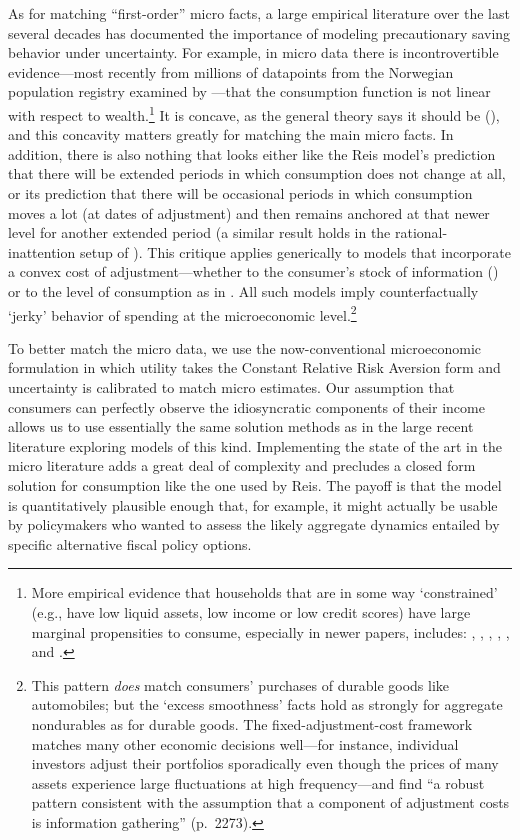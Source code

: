 As for matching ``first-order'' micro facts, a large empirical literature over the last several decades has documented the importance of modeling precautionary saving behavior under uncertainty. For example, in micro data there is incontrovertible evidence---most recently from millions of datapoints from the Norwegian population registry examined by \cite{fhnMPC}---that the consumption function is not linear with respect to wealth.\footnote{More empirical evidence that households that are in some way `constrained' (e.g., have low liquid assets, low income or low credit scores) have large marginal propensities to consume, especially in newer papers, includes: \cite{jpsTax}, \cite{aslCredit}, \cite{bppInequality}, \cite{kvwWealthyH2m}, \cite{jappelliPistaferri_FPMPC}, \cite{parker25million} and \cite{aydinCresponse}.}  It is concave, as the general theory says it should be (\cite{carroll&kimball:concavity}), and this concavity matters greatly for matching the main micro facts.  In addition, there is also nothing that looks  either like the Reis model's prediction that there will be extended periods in which consumption does not change at all, or its prediction that there will be occasional periods in which consumption moves a lot (at dates of adjustment) and then remains anchored at that newer level for another extended period (a similar result holds in the rational-inattention setup of \cite{tutino_RIconsumption}).  This critique applies generically to models that incorporate a convex cost of adjustment---whether to the consumer's stock of information (\cite{reis:inattentive}) or to the level of consumption as in \cite{chettySzeidl:cCommitmentsEcta}.  All such models imply counterfactually `jerky' behavior of spending at the microeconomic level.\footnote{This pattern {\it does} match consumers' purchases of durable goods like automobiles; but the `excess smoothness' facts hold as strongly for aggregate nondurables as for durable goods.  The fixed-adjustment-cost framework matches many other economic decisions well---for instance, individual investors adjust their portfolios sporadically even though the prices of many assets experience large fluctuations at high frequency---and \cite{alvarezGuisoLippi:DurCons} find ``a robust pattern consistent with the assumption that a component of adjustment costs is information gathering'' (p.~2273).}

To better match the micro data, we use the now-conventional microeconomic formulation in which utility takes the Constant Relative Risk Aversion form and uncertainty is calibrated to match micro estimates.  Our assumption that consumers can perfectly observe the idiosyncratic components of their income allows us to use essentially the same solution methods as in the large recent literature exploring models of this kind.
Implementing the state of the art in the micro literature adds a great deal of complexity and precludes a closed form solution for consumption like the one used by Reis. The payoff is that the model is quantitatively plausible enough that, for example, it might actually be usable by policymakers who wanted to assess the likely aggregate dynamics entailed by specific alternative fiscal policy options.

